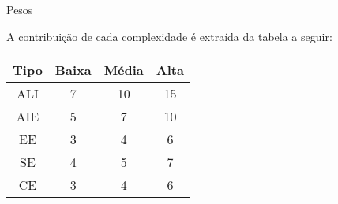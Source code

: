 \begin{frame}{Pesos}
  
  A contribuição de cada complexidade é extraída da tabela a seguir:

  \begin{center}
    \begin{tabular}[ht]{|c|c|c|c|}\hline
      \bf Tipo & \bf Baixa & \bf Média & \bf Alta \\\hline
      ALI & 7 & 10 & 15 \\
      AIE & 5 & 7 & 10 \\
      EE & 3 & 4 & 6 \\
      SE & 4 & 5 & 7 \\
      CE & 3 & 4 & 6 \\\hline
    \end{tabular}
  \end{center}
\end{frame}

